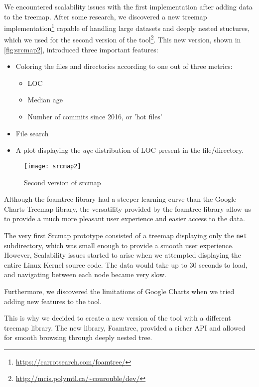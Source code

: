 We encountered scalability issues with the first implementation after adding data to the treemap.
After some research, we discovered a new treemap implementation\footnote{\url{https://carrotsearch.com/foamtree/}} capable of handling large datasets and deeply nested stuctures, which we used for the second version of the tool\footnote{\url{http://mcis.polymtl.ca/~courouble/dev/}}. This new version, shown in \autoref{fig:srcmap2}, introduced three important features: 
\begin{itemize}
	\item Coloring the files and directories according to one out of three metrics:
	\begin{itemize}
		\item \ac{LOC}
		\item Median age
		\item Number of commits since 2016, or 'hot files'
	\end{itemize}
	\item File search
	\item A plot displaying the \textit{age} distribution of \ac{LOC} present in the file/directory.
\end{itemize}

\begin{figure}[htb]
\centering
\texttt{[image: srcmap2]}
\caption{Second version of srcmap}
\label{fig:srcmap2}
\end{figure}

Although the foamtree library had a steeper learning curve than the Google Charts Treemap library, the versatility provided by the foamtree library allow us to provide a much more pleasant user experience and easier access to the data.


The very first Srcmap prototype consisted of a treemap displaying only the \texttt{net} subdirectory, which was small enough to provide a smooth user experience. However, Scalability issues started to arise when we attempted displaying the entire Linux Kernel source code. The data would take up to 30 seconds to load, and navigating between each node became very slow.


Furthermore, we discovered the limitations of Google Charts when we tried adding new features to the tool.


This is why we decided to create a new version of the tool with a different treemap library. The new library, Foamtree, provided a richer API and allowed for smooth browsing through deeply nested tree.






